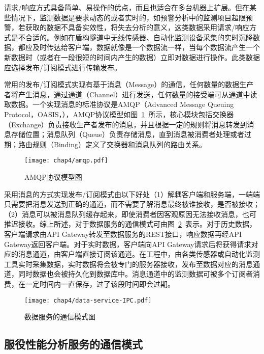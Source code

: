 请求/响应方式具备简单、易操作的优点，而且也适合在多台机器上扩展。但在某些情况下，监测数据是要求动态的或者实时的，如预警分析中的监测项目超限预警，若获取的数据不具备实效性，将失去分析的意义，这类数据采用请求/响应方式是不合适的。例如在盾构隧道中无线传感器、自动化监测设备采集的实时沉降数据，都应及时传达给客户端，数据就像是一个数据流一样，当每个数据流产生一个新数据时（或者在一段很短的时间内产生的数据）立即对数据进行操作。此类数据应选择发布/订阅模式进行传输发布。

常用的发布/订阅模式实现有基于消息（Message）的通信，任何数量的数据生产者将产生消息，通过通道（Channel）进行发送，任何数量的接受端可从通道中读取数据。一个实现消息的标准协议是AMQP（Advanced Message Queuing Protocol，OASIS，\citeyear{amqp2017}），AMQP协议模型如图~\ref{fig:AMQP协议模型图}~所示，核心模块包括交换器（Exchange）负责接收生产者发布的消息，并且根据一定的规则将消息转发到消息存储位置；消息队列（Queue）负责存储消息，直到消息被消费者处理或者过期；路由规则（Binding）定义了交换器和消息队列的路由关系。

\begin{figure}[htb!]
    \centering
    \texttt{[image: chap4/amqp.pdf]}
    \caption{AMQP协议模型图}
    \label{fig:AMQP协议模型图}
\end{figure}

采用消息的方式实现发布/订阅模式由以下好处（1）解耦客户端和服务端，一端端只需要把消息发送到正确的通道，而不需要了解消息最终被谁接收，是否被接收；（2）消息可以被消息队列缓存起来，即使消费者因客观原因无法接收消息，也可推迟接收。综上所述，对于数据服务的通信模式可由图~\ref{fig:数据服务的通信模式图}~表示。对于历史数据，客户端请求由API Gateway转发至数据服务的REST接口，响应数据再经API Gateway返回客户端。对于实时数据，客户端向API Gateway请求后将获得请求对应的消息通道，由客户端直接订阅该通道。在工程中，由各类传感器或自动化监测工具实时采集数据，实时数据将会被专门的服务器接收，发布至数据对应的消息通道，同时数据也会被持久化到数据库中。消息通道中的监测数据可被多个订阅者消费，在一定时间内一直保存，过了该段时间即会过期。

\begin{figure}[htb!]
    \centering
    \texttt{[image: chap4/data-service-IPC.pdf]}
    \caption{数据服务的通信模式图}
    \label{fig:数据服务的通信模式图}
\end{figure}

\subsection{服役性能分析服务的通信模式}

